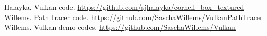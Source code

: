 \documentclass[12pt]{article}
\begin{document}
\pagebreak

\begin{thebibliography}{9}

 Halayka. Vulkan code. \url{https://github.com/sjhalayka/cornell_box_textured}
 Willems. Path tracer code. \url{https://github.com/SaschaWillems/VulkanPathTracer}
 Willems. Vulkan demo codes. \url{https://github.com/SaschaWillems/Vulkan}


\end{thebibliography}
\end{document}
